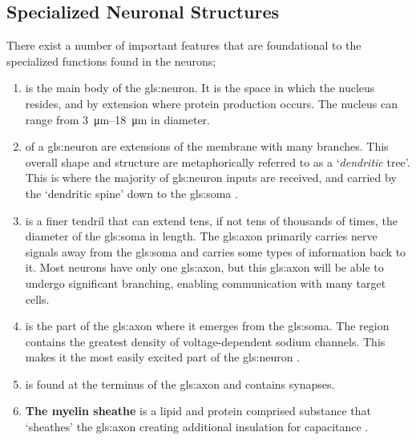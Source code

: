 \documentclass[../../Orator]{subfiles}
\begin{document}
\subsection{Specialized Neuronal Structures}
There exist a number of important features that are foundational to the specialized functions found in the neurons;
\begin{enumerate}
    \item {} is the main body of the \gls{gls:neuron}. It is the space in which the nucleus resides, and by extension where protein production occurs. The nucleus can range from \qtyrange{3}{18}{\um} in diameter.
    \item {} of a \gls{gls:neuron} are extensions of the membrane with many branches. This overall shape and structure are metaphorically referred to as a `\textit{dendritic} tree'\footnotemark. This is where the majority of \gls{gls:neuron} inputs are received, and carried by the `dendritic spine' down to the \gls{gls:soma} \cite{}. 
    \item {} is a finer tendril that can extend tens, if not tens of thousands of times, the diameter of the \gls{gls:soma} in length. The \gls{gls:axon} primarily carries nerve signals away from the \gls{gls:soma} and carries some types of information back to it. Most neurons have only one \gls{gls:axon}, but this \gls{gls:axon} will be able to undergo significant branching, enabling communication with many target cells. 
    \item {} is the part of the \gls{gls:axon} where it emerges from the \gls{gls:soma}. The region contains the greatest density of voltage-dependent sodium channels. This makes it the most easily excited part of the \gls{gls:neuron} \cite{}. 
    \item {} is found at the terminus of the \gls{gls:axon} and contains synapses. 
    \item \textbf{The myelin sheathe} is a lipid and protein comprised substance that `sheathes' the \gls{gls:axon} creating additional insulation for capacitance \cite{}.
\end{enumerate}
\end{document}
